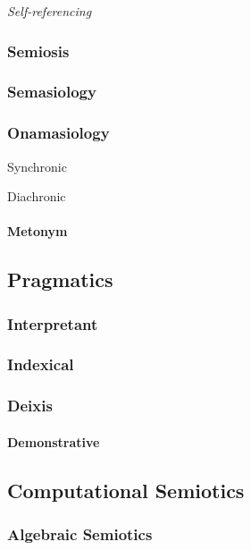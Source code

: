 \emph{Self-referencing}



\subsubsection{Semiosis}\label{sec:semiosis}

\subsubsection{Semasiology}\label{sec:semasiology}

\subsubsection{Onamasiology}\label{sec:onamasiology}

Synchronic

Diachronic

\paragraph{Metonym}\label{sec:metonym}\hfill



\subsection{Pragmatics}\label{sec:pragmatics}

\subsubsection{Interpretant}\label{sec:interpretant}

\subsubsection{Indexical}\label{sec:indexical}

\subsubsection{Deixis}\label{sec:deixis}

\paragraph{Demonstrative}\label{sec:demonstrative}\hfill



\subsection{Computational Semiotics}\label{sec:computational_semiotics}

\subsubsection{Algebraic Semiotics}\label{sec:algebraic_semiotics}
